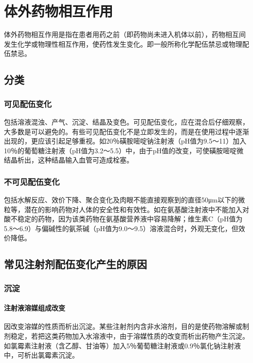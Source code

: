 \section{体外药物相互作用}

体外药物相互作用是指在患者用药之前（即药物尚未进入机体以前），药物相互间发生化学或物理性相互作用，使药性发生变化。即一般所称化学配伍禁忌或物理配伍禁忌。

\subsection{分类}

\subsubsection{可见配伍变化}

包括溶液混浊、产气、沉淀、结晶及变色。可见配伍变化，应在混合后仔细观察，大多数是可以避免的。有些可见配伍变化不是立即发生的，而是在使用过程中逐渐出现的，更应该引起足够重视。如20％磺胺嘧啶钠注射液（pH值为9.5～11）加入10％的葡萄糖注射液（pH值为3.2～5.5）中，由于pH值的改变，可使磺胺嘧啶微结晶析出，这种结晶输入血管可造成栓塞。

\subsubsection{不可见配伍变化}

包括水解反应、效价下降、聚合变化及肉眼不能直接观察到的直径50μm以下的微粒等，潜在的影响药物对人体的安全性和有效性。如在氨基酸注射液中不能加入对酸不稳定的药物，因为该类药物在氨基酸营养液中容易降解；维生素C（pH值为5.8～6.9）与偏碱性的氨茶碱（pH值为9.0～9.5）溶液混合时，外观无变化，但效价降低。

\subsection{常见注射剂配伍变化产生的原因}

\subsubsection{沉淀}
\paragraph{注射液溶媒组成改变}

因改变溶媒的性质而析出沉淀。某些注射剂内含非水溶剂，目的是使药物溶解或制剂稳定，若把这类药物加入水溶液中，由于溶媒性质的改变而析出药物产生沉淀。如氯霉素注射液（含乙醇、甘油等）加入5％葡萄糖注射液或0.9％氯化钠注射液中，可析出氯霉素沉淀。
